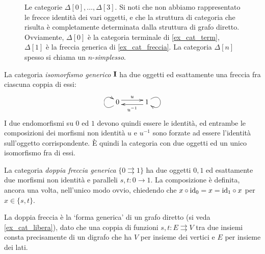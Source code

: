 \begin{example}
\begin{figure}[h]
\begin{center}
		\end{center}
		\caption{Le categorie \(\Delta[0], \dots,\Delta[3]\). Si noti che non abbiamo rappresentato le frecce identità dei vari oggetti, e che la struttura di categoria che risulta è completamente determinata dalla struttura di grafo diretto. Ovviamente, \(\Delta[0]\) è la categoria terminale di \ref{ex_cat_term}, \(\Delta[1]\) è la freccia generica di \ref{ex_cat_freccia}. La categoria \(\Delta[n]\) spesso si chiama un \(n\)-\emph{simplesso}. }
		\label{fig:le_delta}
	\end{figure}
\end{example}
\begin{example}\label{ex_cat_iso}
	La categoria \emph{isomorfismo generico} \(\mathbf{I}\) ha due oggetti ed esattamente una freccia fra ciascuna coppia di essi:
	\[\xymatrix@C=7ex{0 \ar@<.7ex>[r]^u \ar@(dl,ul)[] & 1 \ar@<.7ex>[l]^{u^{-1}} \ar@(ur,dr)[]}\]
	I due endomorfismi su \(0\) ed \(1\) devono quindi essere le identità, ed entrambe le composizioni dei morfismi non identità \(u\) e \(u^{-1}\) sono forzate ad essere l'identità sull'oggetto corrispondente. \`E quindi la categoria con due oggetti ed un unico isomorfismo fra di essi.
\end{example}
\begin{example}\label{ex_cat_doppiafreccia}
	La categoria \emph{doppia freccia generica} \(\{0\rightrightarrows 1\}\) ha due oggetti \(0,1\) ed esattamente due morfismi non identità e paralleli \(s,t : 0\to 1\). La composizione è definita, ancora una volta, nell'unico modo ovvio, chiedendo che \(x\circ \mathrm{id}_0=x=\mathrm{id}_1\circ x\) per \(x\in\{s,t\}\).

	La doppia freccia è la `forma generica' di un grafo diretto (si veda \ref{ex_cat_libera}), dato che una coppia di funzioni \(s,t: E \rightrightarrows V\) tra due insiemi consta precisamente di un digrafo che ha \(V\) per insieme dei vertici e \(E\) per insieme dei lati.
\end{example}

